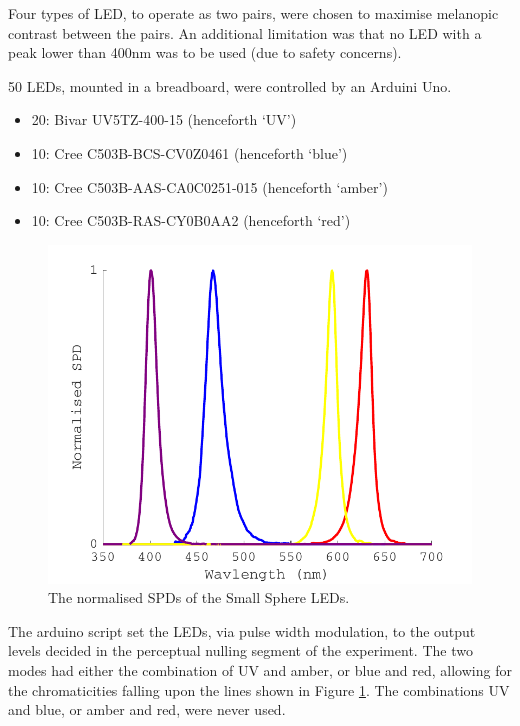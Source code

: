 Four types of LED, to operate as two pairs, were chosen to maximise melanopic contrast between the pairs. An additional limitation was that no LED with a peak lower than 400nm was to be used (due to safety concerns).

50 LEDs, mounted in a breadboard, were controlled by an Arduini Uno. %

\begin{itemize}
    \item 20: Bivar UV5TZ-400-15 (henceforth `UV')
    \item 10: Cree C503B-BCS-CV0Z0461 (henceforth `blue')
    \item 10: Cree C503B-AAS-CA0C0251-015 (henceforth `amber')
    \item 10: Cree C503B-RAS-CY0B0AA2 (henceforth `red')
\end{itemize}


\begin{figure}[htbp]
\includegraphics[max width=\textwidth,center]{figs/SmallSphere/LED_SPDs.pdf}
\caption{The normalised \glspl{SPD} of the Small Sphere \glspl{LED}.}
\label{fig:LED_SPDs}
\end{figure}

The arduino script set the \glspl{LED}, via pulse width modulation, to the output levels decided in the perceptual nulling segment of the experiment. The two modes had either the combination of UV and amber, or blue and red, allowing for the chromaticities falling upon the lines shown in Figure \ref{fig:LED_SPDs}. The combinations UV and blue, or amber and red, were never used.

